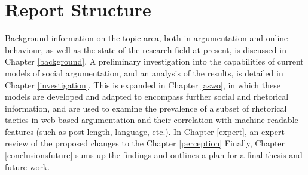 \section{Report Structure}
Background information on the topic area, both in argumentation and online behaviour, as well as the state of the research field at present, is discussed in Chapter \ref{background}.
A preliminary investigation into the capabilities of current models of social argumentation, and an analysis of the results, is detailed in Chapter \ref{investigation}.
This is expanded in Chapter \ref{aswo}, in which these models are developed and adapted to encompass further social and rhetorical information, and are used to examine the prevalence of a subset of rhetorical tactics in web-based argumentation and their correlation with machine readable features (such as post length, language, etc.).
In Chapter \ref{expert}, an expert review of the proposed changes to the 
Chapter \ref{perception}
Finally, Chapter \ref{conclusionsfuture} sums up the findings and outlines a plan for a final thesis and future work.
